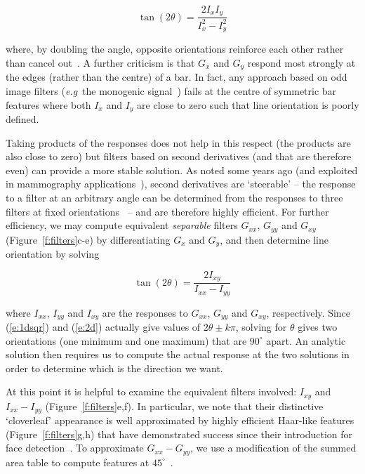 \documentclass{bmvc2k}
\def\eg{\emph{e.g}\bmvaOneDot}
\newcommand{\fref}[1]{Figure~\ref{#1}}
\newcommand{\eref}[1]{(\ref{#1})}
\def\Gx{G_x}
\def\Gy{G_y}
\def\Gxx{G_{xx}}
\def\Gxy{G_{xy}} \def\Gyx{G_{yx}}
\def\Gyy{G_{yy}}
\def\Ix{I_x}
\def\Iy{I_y}
\def\Ixx{I_{xx}}
\def\Ixy{I_{xy}}
\def\Iyy{I_{yy}}
\begin{document}
\begin{equation}
\tan(2\theta) = \frac{2\Ix\Iy}{\Ix^2-\Iy^2}
\label{e:1dsqr}
\end{equation}

\noindent where, by doubling the angle, opposite orientations reinforce each other rather than cancel out~\cite{Mardia_Jupp_00}. A further criticism is that $\Gx$ and $\Gy$ respond most strongly at the edges (rather than the centre) of a bar. In fact, any approach based on odd image filters (\eg~the monogenic signal~\cite{Felsberg_Sommer_TSP01}) fails at the centre of symmetric bar features where both $\Ix$ and $\Iy$ are close to zero such that line orientation is poorly defined.

Taking products of the responses does not help in this respect (the products are also close to zero) but filters based on second derivatives (and that are therefore even) can provide a more stable solution. As noted some years ago (and exploited in mammography applications~\cite{Karssemeijer_teBrake_TMI96}), second derivatives are `steerable' -- the response to a filter at an arbitrary angle can be determined from the responses to three filters at fixed orientations~\cite{Freeman_Adelson_TPAMI91,Koenderink_vanDoorn_TPAMI92} -- and are therefore highly efficient. For further efficiency, we may compute equivalent \emph{separable} filters $\Gxx$, $\Gyy$ and $\Gxy$ (\fref{f:filters}c-e) by differentiating $\Gx$ and $\Gy$, and then determine line orientation by solving

\begin{equation}
\tan(2\theta) = \frac{2\Ixy}{\Ixx-\Iyy}
\label{e:2d}
\end{equation}

\noindent where $\Ixx$, $\Iyy$ and $\Ixy$ are the responses to $\Gxx$, $\Gyy$ and $\Gxy$, respectively. Since \eref{e:1dsqr} and \eref{e:2d} actually give values of $2\theta \pm k\pi$, solving for $\theta$ gives two orientations (one minimum and one maximum) that are $90^\circ$ apart. An analytic solution then requires us to compute the actual response at the two solutions in order to determine which is the direction we want. 

At this point it is helpful to examine the equivalent filters involved: $\Ixy$ and $\Ixx-\Iyy$ (\fref{f:filters}e,f). In particular, we note that their distinctive `cloverleaf' appearance is well approximated by highly efficient Haar-like features (\fref{f:filters}g,h) that have demonstrated success since their introduction for face detection~\cite{Viola_Jones_IJCV04}. To approximate $\Gxx-\Gyy$, we use a modification of the summed area table to compute features at $45^\circ$~\cite{Lienhart_Maydt_ICIP02}.
\end{document}
